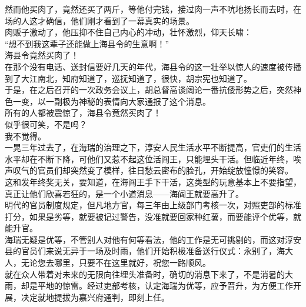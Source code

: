 \begin{multicols}{\theparacolNo}
然而他买肉了，竟然还买了两斤，等他付完钱，接过肉一声不吭地扬长而去时，在场的人这才确信，他们刚才看到了一幕真实的场景。\\

肉贩子激动了，他压抑不住自己内心的冲动，壮怀激烈，仰天长啸：\\

“想不到我这辈子还能做上海县令的生意啊！”\\

海县令竟然买肉了！\\

在那个没有电话、送封信要好几天的年代，海县令的这一壮举以惊人的速度被传播到了大江南北，知府知道了，巡抚知道了，很快，胡宗宪也知道了。\\

于是，在之后召开的一次政务会议上，胡总督高谈阔论一番抗倭形势之后，突然神色一变，以一副极为神秘的表情向大家通报了这个消息。\\

所有的人都被震惊了，海县令竟然买肉了！\\

似乎很可笑，不是吗？\\

我不觉得。\\

一晃三年过去了，在海瑞的治理之下，淳安人民生活水平不断提高，官吏们的生活水平却在不断下降，可他们又惹不起这位活阎王，只能埋头干活。但临近年终，唉声叹气的官员们却突然变了模样，往日愁云密布的脸孔，开始绽放憧憬的笑容。\\

这和发年终奖无关，要知道，在海阎王手下干活，这类型的玩意基本上不要指望，真正让他们欣喜若狂的，是一个小道消息——海阎王就要高升了。\\

明代的官员制度规定，但凡地方官，每三年由上级部门考核一次，对照吏部的标准打分，如果是劣等，就要被记过警告，没准就要回家种红薯，而要能评个优等，就能升官。\\

海瑞无疑是优等，不管别人对他有何等看法，他的工作是无可挑剔的，而这对淳安县的官员们来说无异于一场及时雨，他们开始积极准备送行仪式：永别了，海大人，无论您去哪里，只要不在这里就好，祝您一路顺风。\\

就在众人带着对未来的无限向往埋头准备时，确切的消息下来了，不是消暑的大雨，却是平地的惊雷。经过吏部考核，认定海瑞为优等，应予晋升，为方便工作开展，决定就地提拔为嘉兴府通判，即刻上任。\\


\end{multicols}
